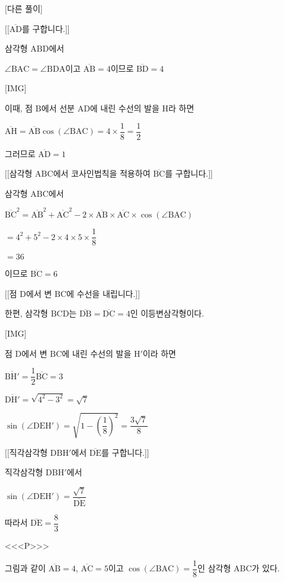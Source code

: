 \documentclass{oblivoir}
\begin{document}
[다른 풀이]

[[$\overline{\mathrm{AD}}$를 구합니다.]]

삼각형 $\mathrm{ABD}$에서

$\angle\mathrm{BAC}=\angle\mathrm{BDA}$이고 $\overline{\mathrm{AB}}=4$이므로 $\overline{\mathrm{BD}}=4$

[IMG]

이때, 점 $\mathrm{B}$에서 선분 $\mathrm{AD}$에 내린 수선의 발을 $\mathrm{H}$라 하면

$\overline{\mathrm{AH}}=\overline{\mathrm{AB}}\cos(\angle\mathrm{BAC})=4\times\dfrac{1}{8}=\dfrac{1}{2}$

그러므로 $\overline{\mathrm{AD}}=1$

[[삼각형 $\mathrm{ABC}$에서 코사인법칙을 적용하여 $\overline{\mathrm{BC}}$를 구합니다.]]

삼각형 $\mathrm{ABC}$에서

$\overline{\mathrm{BC}}^{2}$$=\overline{\mathrm{AB}}^{2}+\overline{\mathrm{AC}}^{2}-2\times\overline{\mathrm{AB}}\times\overline{\mathrm{AC}}\times\cos(\angle\mathrm{BAC})$

$=4^{2}+5^{2}-2\times 4\times 5\times\dfrac{1}{8}$

$=36$

이므로 $\overline{\mathrm{BC}}=6$

[[점 $\mathrm{D}$에서 변 $\mathrm{BC}$에 수선을 내립니다.]]

한편, 삼각형 $\mathrm{BCD}$는 $\overline{\mathrm{DB}}=\overline{\mathrm{DC}}=4$인 이등변삼각형이다.

[IMG]

점 $\mathrm{D}$에서 변 $\mathrm{BC}$에 내린 수선의 발을 $\mathrm{H}'$이라 하면

$\overline{\mathrm{BH'}}=\dfrac{1}{2}\overline{\mathrm{BC}}=3$

$\overline{\mathrm{DH'}}=\sqrt{4^{2}-3^{2}}=\sqrt{7}$

$\sin (\angle \mathrm{DEH'})=\sqrt{1-\left( \dfrac{1}{8} \right)^{2}}=\dfrac{3\sqrt{7}}{8}$

[[직각삼각형 $\mathrm{DBH}'$에서  $\overline{\mathrm{DE}}$를 구합니다.]]

직각삼각형 $\mathrm{DBH}'$에서

$\sin (\angle \mathrm{DEH'})=\dfrac{\sqrt{7}}{\overline{\mathrm{DE}}}$

따라서 $\overline{\mathrm{DE}}=\dfrac{8}{3}$

<<<P>>>

그림과 같이 $\overline{\mathrm{AB}} = 4$, $\overline{\mathrm{AC}} =5$이고 $\cos(\angle\mathrm{BAC})=\dfrac{1}{8}$인 삼각형 $\mathrm{ABC}$가 있다.
\end{document}
